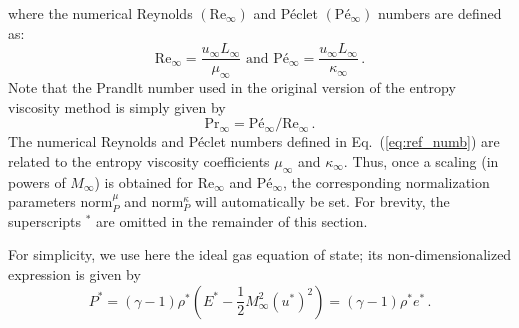 \documentclass[review,10pt]{elsarticle}
\newcommand{\norm}{\textrm{norm}}
\renewcommand{\Re}{\textrm{Re}}
\newcommand{\Pe}{\textrm{P\'e}}
\renewcommand{\Pr}{\textrm{Pr}}
\newcommand{\eqt}[1]{Eq.~(\ref{#1})}                     %
\begin{document}
where the numerical Reynolds $(\Re_\infty)$ and P\'eclet $(\Pe_\infty)$ numbers are defined as:
%
\begin{equation}
\label{eq:ref_numb}
\Re_\infty = \frac{u_\infty L_\infty}{\mu_\infty} \text{ and }
\Pe_\infty = \frac{u_\infty L_\infty}{\kappa_\infty} \, .
\end{equation}
%
Note that the Prandlt number used in the original version of the entropy viscosity method is simply given by 
\begin{equation} \label{eq:ref_nb_pr} 
\Pr_\infty = \Pe_\infty / \Re_\infty \, .
\end{equation}
%
The numerical Reynolds and P\'eclet numbers defined in \eqt{eq:ref_numb} are related to the entropy 
viscosity coefficients $\mu_\infty$ and $\kappa_\infty$. Thus, once a scaling (in powers of $M_\infty$) 
is obtained for $\Re_\infty$ and $\Pe_\infty$, the corresponding normalization parameters $\norm_P^\mu$ 
and $\norm_P^\kappa$ will automatically be set. 
For brevity, the superscripts $^*$ are omitted in the remainder of this section. 

For simplicity, we use here the ideal gas equation of state; its non-dimensionalized expression is given by
%
\begin{equation}
\label{eq:euler_eq2_eos}
P^* = \left( \gamma-1 \right) \rho^*\left(  E^* -\frac{1}{2} M_\infty^2 (u^*)^2 \right) = \left( \gamma-1 \right) \rho^* e^* \, .
\end{equation}
\end{document}
